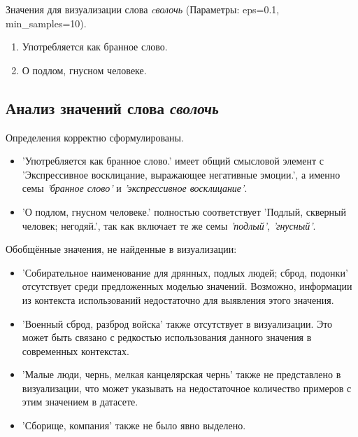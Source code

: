 Значения для визуализации слова \textit{cволочь} (Параметры: eps=0.1, min\_samples=10).

\begin{enumerate}
    \item Употребляется как бранное слово.
    \item О подлом, гнусном человеке.
\end{enumerate}

\subsection*{Анализ значений слова \textit{сволочь}}

Определения корректно сформулированы.

\begin{itemize}
    \item ’Употребляется как бранное слово.’ имеет общий смысловой элемент с
’Экспрессивное восклицание, выражающее негативные эмоции.’,
а именно семы \textit{’бранное слово’} и \textit{’экспрессивное восклицание’}.

    \item ’О подлом, гнусном человеке.’ полностью соответствует
    ’Подлый, скверный человек; негодяй.’, так как включает те же семы \textit{’подлый’}, \textit{’гнусный’}.
\end{itemize}


Обобщённые значения, не найденные в визуализации:
\begin{itemize}
    \item ’Собирательное наименование для дрянных, подлых людей; сброд, подонки’ отсутствует среди предложенных моделью значений.
Возможно, информации из контекста использований недостаточно для выявления этого значения.

    \item ’Военный сброд, разброд войска’ также отсутствует в визуализации.
Это может быть связано с редкостью использования данного значения в современных контекстах.

    \item ’Малые люди, чернь, мелкая канцелярская чернь’ также не представлено в визуализации,
что может указывать на недостаточное количество примеров с этим значением в датасете.

    \item ’Сборище, компания’ также не было явно выделено.
\end{itemize}

